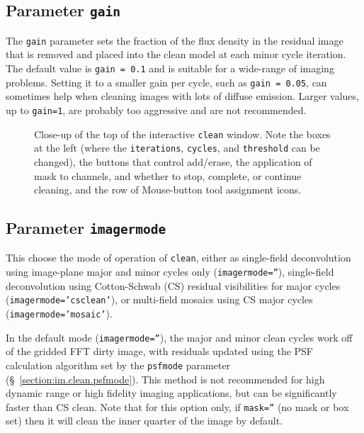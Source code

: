 \subsection{Parameter {\tt gain} }
\label{section:im.clean.gain}

The {\tt gain} parameter sets the fraction of the flux density in
the residual image that is removed and placed into the clean model
at each minor cycle iteration.  The default value is {\tt gain = 0.1}
and is suitable for a wide-range of imaging problems.  Setting it to
a smaller gain per cycle, such as {\tt gain = 0.05}, can sometimes 
help when cleaning images with lots of diffuse emission.  Larger values,
up to {\tt gain=1}, are probably too aggressive and are not recommended.

\begin{figure}[h!]
\begin{center}
\caption{\label{fig:clean_inter_control} Close-up of the top of the 
interactive {\tt clean} window.  Note the boxes at the left
(where the {\tt iterations}, {\tt cycles}, and {\tt threshold} can
be changed), the buttons that control add/erase, the application
of mask to channels, and whether to stop, complete, or continue
cleaning, and the row of Mouse-button tool assignment icons.} 
\hrulefill
\end{center}
\end{figure}

\subsection{Parameter {\tt imagermode} }
\label{section:im.clean.imagermode}

This choose the mode of operation of {\tt clean}, either as
single-field deconvolution using image-plane major and minor
cycles only ({\tt imagermode=''}), single-field deconvolution
using Cotton-Schwab (CS) residual visibilities for major cycles
({\tt imagermode='csclean'}), or multi-field mosaics using CS
major cycles ({\tt imagermode='mosaic'}).

In the default mode ({\tt imagermode=''}), the major and minor
clean cycles work off of the gridded FFT dirty image, with residuals
updated using the PSF calculation algorithm set by the {\tt psfmode}
parameter (\S~\ref{section:im.clean.psfmode}).  This method is not
recommended for high dynamic range or high fidelity imaging 
applications, but can be significantly faster than CS clean.
Note that for this option only, if {\tt mask=''} (no mask or box
set) then it will clean the inner quarter of the image by
default.

